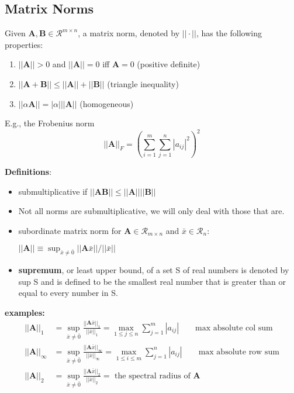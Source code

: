 \documentclass[12pt]{article}
\newcommand{\ve}[1]{\ensuremath{\mathbf{#1}}}
\begin{document}
\subsection{Matrix Norms}
Given $\ve{A}, \ve{B} \in \mathcal{R}^{m \times n}$, a matrix norm, denoted by $|| \cdot ||$, has the following properties:
%
\begin{enumerate}
\item $||\ve{A}|| > 0$ and $||\ve{A}|| = 0$ iff $\ve{A} = 0$ (positive definite)
\item $||\ve{A} + \ve{B}|| \leq ||\ve{A}|| + ||\ve{B}||$ (triangle inequality)
\item $||\alpha \ve{A}|| = |\alpha| ||\ve{A}||$ (homogeneous)
\end{enumerate}

E.g., the Frobenius norm 
%
\begin{equation}
||\ve{A}||_F = ( \sum_{i=1}^m \sum_{j=1}^n |a_{ij}|^2 )^2 \nonumber
\end{equation}

\textbf{Definitions}:
\begin{itemize}
\item submultiplicative if $||\ve{A} \ve{B}|| \leq ||\ve{A}|| ||\ve{B}||$

\item Not all norms are submultiplicative, we will only deal with those that are. 

\item subordinate matrix norm for $\ve{A} \in \mathcal{R}_{m \times n}$ and $\bar{x} \in \mathcal{R}_n$:

$||\ve{A}|| \equiv \displaystyle \sup_{\bar{x} \neq \bar{0}} ||\ve{A}\bar{x}|| / ||\bar{x}||$

\item \textbf{supremum}, or least upper bound, of a set S of real numbers is denoted by sup S and is defined to be the smallest real number that is greater than or equal to every number in S.
\end{itemize}

\textbf{examples:}
%
\begin{align}
||\ve{A}||_{1} &= \displaystyle \sup_{\bar{x} \neq \bar{0}} \frac{||\ve{A}\bar{x}||_{1}}{||\bar{x}||_{1}} =
\displaystyle \max_{1 \leq j \leq n} \sum_{j=1}^m |a_{ij}| \qquad \text{max absolute col sum} \nonumber \\
%
||\ve{A}||_{\infty} &= \displaystyle \sup_{\bar{x} \neq \bar{0}} \frac{||\ve{A}\bar{x}||_{\infty}}{||\bar{x}||_{\infty}} = 
\displaystyle \max_{1 \leq i \leq m} \sum_{j=1}^n |a_{ij}| \qquad \text{max absolute row sum}\nonumber \\
%
||\ve{A}||_{2} &= \displaystyle \sup_{\bar{x} \neq \bar{0}} \frac{||\ve{A}\bar{x}||_{2}}{||\bar{x}||_{2}} = \text{ the spectral radius of }\ve{A} \nonumber 
\end{align}
\end{document}
